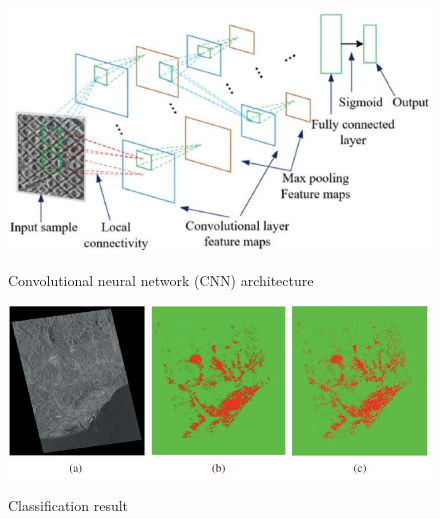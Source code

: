 \documentclass[]{IEEEtran}
\begin{document}

\newpage
\begin{figure}[!hbt]
		\vspace{1.7cm}
		\begin{center}
			\includegraphics[width=\columnwidth]{fw}
			\caption{Convolutional neural network (CNN) architecture}
			\label{fig:fw}
		    \hspace{0.5cm}
			\includegraphics[width=\columnwidth]{rt}
			\caption{Classification result}
			\label{fig:rt}
		\end{center}
	\end{figure}

%
%
%
%
%
%

\end{document}
